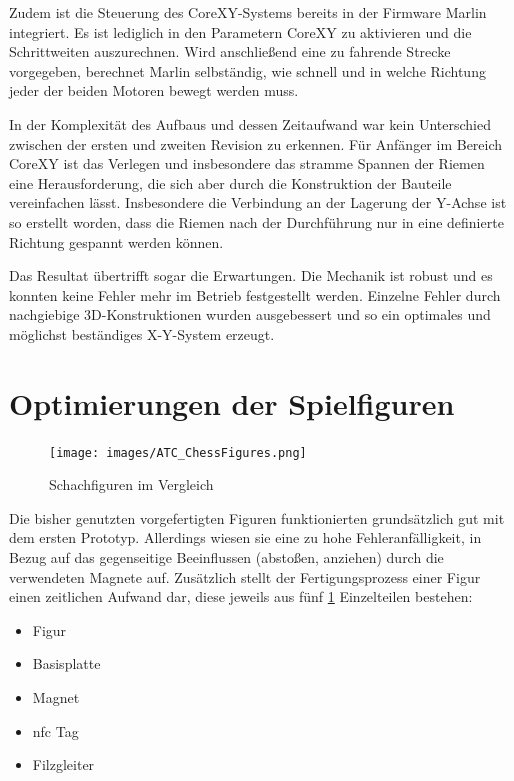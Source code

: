 Zudem ist die Steuerung des CoreXY-Systems bereits in der Firmware
Marlin integriert. Es ist lediglich in den Parametern CoreXY zu
aktivieren und die Schrittweiten auszurechnen. Wird anschließend eine zu
fahrende Strecke vorgegeben, berechnet Marlin selbständig, wie schnell
und in welche Richtung jeder der beiden Motoren bewegt werden muss.

In der Komplexität des Aufbaus und dessen Zeitaufwand war kein
Unterschied zwischen der ersten und zweiten Revision zu erkennen. Für
Anfänger im Bereich CoreXY ist das Verlegen und insbesondere das stramme
Spannen der Riemen eine Herausforderung, die sich aber durch die
Konstruktion der Bauteile vereinfachen lässt. Insbesondere die
Verbindung an der Lagerung der Y-Achse ist so erstellt worden, dass die
Riemen nach der Durchführung nur in eine definierte Richtung gespannt
werden können.

Das Resultat übertrifft sogar die Erwartungen. Die Mechanik ist robust
und es konnten keine Fehler mehr im Betrieb festgestellt werden.
Einzelne Fehler durch nachgiebige 3D-Konstruktionen wurden ausgebessert
und so ein optimales und möglichst beständiges X-Y-System erzeugt.

\hypertarget{optimierungen-der-spielfiguren}{%
\section{Optimierungen der
Spielfiguren}\label{optimierungen-der-spielfiguren}}

\begin{figure}
\centering
\texttt{[image: images/ATC\_ChessFigures.png]}
\caption{Schachfiguren im Vergleich \label{ATC_ChessFigures}}
\end{figure}

Die bisher genutzten vorgefertigten Figuren funktionierten grundsätzlich
gut mit dem ersten Prototyp. Allerdings wiesen sie eine zu hohe
Fehleranfälligkeit, in Bezug auf das gegenseitige Beeinflussen
(abstoßen, anziehen) durch die verwendeten Magnete auf. Zusätzlich
stellt der Fertigungsprozess einer Figur einen zeitlichen Aufwand dar,
diese jeweils aus fünf \ref{ATC_ChessFigures} Einzelteilen bestehen:

\begin{itemize}
\tightlist
\item
  Figur
\item
  Basisplatte
\item
  Magnet
\item
  \gls{nfc} Tag
\item
  Filzgleiter
\end{itemize}

